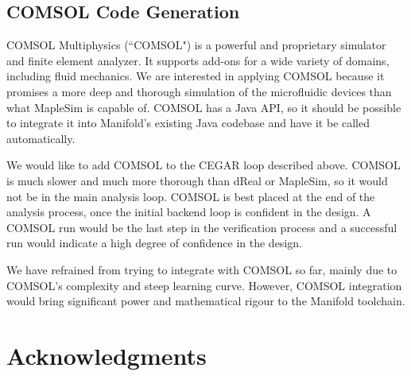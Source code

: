 \subsection{COMSOL Code Generation}

COMSOL Multiphysics (``COMSOL") is a powerful and proprietary simulator and finite element analyzer.
It supports add-ons for a wide variety of domains, including fluid mechanics.
We are interested in applying COMSOL because it promises a more deep and thorough simulation of the microfluidic devices than what MapleSim is capable of.
COMSOL has a Java API, so it should be possible to integrate it into Manifold's existing Java codebase and have it be called automatically.


We would like to add COMSOL to the CEGAR loop described above.
COMSOL is much slower and much more thorough than dReal or MapleSim, so it would not be in the main analysis loop.
COMSOL is best placed at the end of the analysis process, once the initial backend loop is confident in the design.
A COMSOL run would be the last step in the verification process and a successful run would indicate a high degree of confidence in the design.

We have refrained from trying to integrate with COMSOL so far, mainly due to COMSOL's complexity and steep learning curve.
However, COMSOL integration would bring significant power and mathematical rigour to the Manifold toolchain.

\section{Acknowledgments}


